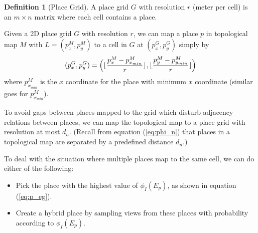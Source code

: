 \documentclass[10pt, titlepage]{article}
\theoremstyle{definition}
\newtheorem{definition}{Definition}[section]
\DeclarePairedDelimiter\floor{\lfloor}{\rfloor}
\begin{document}
\begin{definition}[Place Grid]
A place grid $G$ with resolution $r$ (meter per cell) is an $m\times n$ matrix where each cell contains a place.
\end{definition}

Given a 2D place grid $G$ with resolution $r$, we can map a place $p$ in topological map $M$ with $L=(p_x^M, p_y^M)$ to a cell in $G$ at $(p_x^G, p_y^G)$ simply by
\begin{equation}
  (p_x^G, p_y^G) = \Big(\floor{\frac{p_x^M-p_{x_{min}}^M}{r}}, \floor{\frac{p_y^M-p_{y_{min}}^M}{r}}\Big)
\end{equation}
where $p_{x_{min}}^M$ is the $x$ coordinate for the place with minimum $x$ coordinate (similar goes for $p_{x_{min}}^M$).

To avoid gaps between places mapped to the grid which disturb adjacency relations between places, we can map the topological map to a place grid with resolution at most $d_n$. (Recall from equation (\ref{eq:phi_n}) that places in a topological map are separated by a predefined distance $d_n$.)\label{sc:avoidgaps}

To deal with the situation where multiple places map to the same cell, we can do either of the following:
\begin{itemize}
\item Pick the place with the highest value of $\phi_I(E_p)$, as shown in equation (\ref{eq:p_eg}). 
\item Create a hybrid place by sampling views from these places with probability according to $\phi_I(E_p)$.
\end{itemize}
\end{document}
